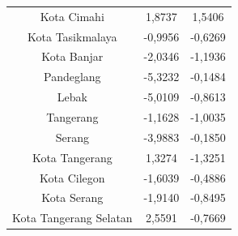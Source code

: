 \begin{longtable}{|c|c|c|}
Kota Cimahi & 1,8737 & 1,5406 \\
Kota Tasikmalaya & -0,9956 & -0,6269 \\
Kota Banjar & -2,0346 & -1,1936 \\
Pandeglang & -5,3232 & -0,1484 \\
Lebak & -5,0109 & -0,8613 \\
Tangerang & -1,1628 & -1,0035 \\
Serang & -3,9883 & -0,1850 \\
Kota Tangerang & 1,3274 & -1,3251 \\
Kota Cilegon & -1,6039 & -0,4886 \\
Kota Serang & -1,9140 & -0,8495 \\
Kota Tangerang Selatan & 2,5591 & -0,7669 \\
\hline
\end{longtable}